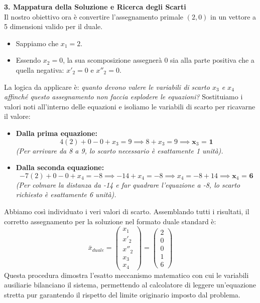 \documentclass[12pt, a4paper]{article}
\begin{document}
	\vspace{0.4cm}
	\textbf{3. Mappatura della Soluzione e Ricerca degli Scarti}\\
	Il nostro obiettivo ora è convertire l'assegnamento primale $(2, 0)$ in un vettore a 5 dimensioni valido per il duale. 
	\begin{itemize}
		\item Sappiamo che $x_1 = 2$.
		\item Essendo $x_2 = 0$, la sua scomposizione assegnerà $0$ sia alla parte positiva che a quella negativa: $x'_2 = 0$ e $x''_2 = 0$.
	\end{itemize}
	
	La logica da applicare è: \textit{quanto devono valere le variabili di scarto $x_3$ e $x_4$ affinché questo assegnamento non faccia esplodere le equazioni?}
	Sostituiamo i valori noti all'interno delle equazioni e isoliamo le variabili di scarto per ricavarne il valore:
	
	\begin{itemize}[label=$\circ$, itemsep=4pt, leftmargin=1.5cm]
		\item \textbf{Dalla prima equazione:}
		\[
		4(2) + 0 - 0 + x_3 = 9 \implies 8 + x_3 = 9 \implies \textbf{x}_3 \textbf{ = 1}
		\]
		\textit{(Per arrivare da 8 a 9, lo scarto necessario è esattamente 1 unità).}
		
		\item \textbf{Dalla seconda equazione:}
		\[
		-7(2) + 0 - 0 + x_4 = -8 \implies -14 + x_4 = -8 \implies x_4 = -8 + 14 \implies \textbf{x}_4 \textbf{ = 6}
		\]
		\textit{(Per colmare la distanza da -14 e far quadrare l'equazione a -8, lo scarto richiesto è esattamente 6 unità).}
	\end{itemize}
	
	Abbiamo così individuato i veri valori di scarto. Assemblando tutti i risultati, il corretto assegnamento per la soluzione nel formato duale standard è:
	\[
	\bar{x}_{duale} = \begin{pmatrix} x_1 \\ x'_2 \\ x''_2 \\ x_3 \\ x_4 \end{pmatrix} = \begin{pmatrix} 2 \\ 0 \\ 0 \\ 1 \\ 6 \end{pmatrix}
	\]
	Questa procedura dimostra l'esatto meccanismo matematico con cui le variabili ausiliarie bilanciano il sistema, permettendo al calcolatore di leggere un'equazione stretta pur garantendo il rispetto del limite originario imposto dal problema.
	
\end{document}
